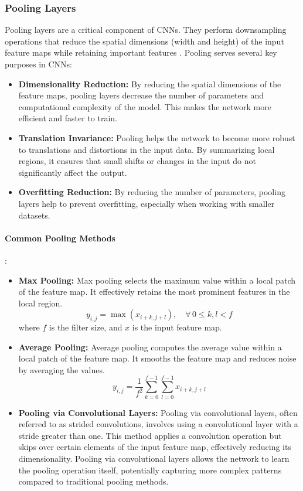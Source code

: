 \documentclass[english,11pt,a4paper,titlepage]{article}
\begin{document}
	\subsubsection*{Pooling Layers}
	Pooling layers are a critical component of CNNs. They perform downsampling operations that reduce the spatial dimensions (width and height) of the input feature maps while retaining important features \cite{nirthikaPoolingConvolutionalNeural2022}. Pooling serves several key purposes in CNNs:
	\begin{itemize}
		\item \textbf{Dimensionality Reduction:} By reducing the spatial dimensions of the feature maps, pooling layers decrease the number of parameters and computational complexity of the model. This makes the network more efficient and faster to train.
		\item \textbf{Translation Invariance:} Pooling helps the network to become more robust to translations and distortions in the input data. By summarizing local regions, it ensures that small shifts or changes in the input do not significantly affect the output.
		\item \textbf{Overfitting Reduction:} By reducing the number of parameters, pooling layers help to prevent overfitting, especially when working with smaller datasets.
	\end{itemize}
	
	\paragraph{Common Pooling Methods}:
	\begin{itemize}
		\item \textbf{Max Pooling:} Max pooling selects the maximum value within a local patch of the feature map. It effectively retains the most prominent features in the local region.
		\begin{equation*}
			y_{i,j} = \max \left( x_{i+k,j+l} \right), \quad \forall \, 0 \leq k,l < f
		\end{equation*}
		where \( f \) is the filter size, and \( x \) is the input feature map.
		
		\item \textbf{Average Pooling:} Average pooling computes the average value within a local patch of the feature map. It smooths the feature map and reduces noise by averaging the values.
		\begin{equation*}
			y_{i,j} = \frac{1}{f^2} \sum_{k=0}^{f-1} \sum_{l=0}^{f-1} x_{i+k,j+l}
		\end{equation*}
		
		\item \textbf{Pooling via Convolutional Layers:} Pooling via convolutional layers, often referred to as strided convolutions, involves using a convolutional layer with a stride greater than one. This method applies a convolution operation but skips over certain elements of the input feature map, effectively reducing its dimensionality. Pooling via convolutional layers allows the network to learn the pooling operation itself, potentially capturing more complex patterns compared to traditional pooling methods.
	\end{itemize}
	
\end{document}
